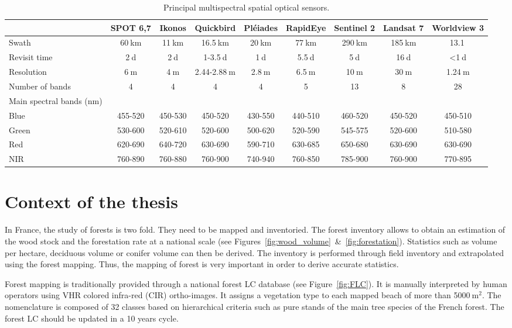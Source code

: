 \begin{table}
\begin{center}
\begin{tabular}{l|c|c|c|c|c|c|c|c}
& \textbf{SPOT 6,7} & \textbf{Ikonos} & \textbf{Quickbird} & \textbf{Pléiades} & \textbf{RapidEye} & \textbf{Sentinel 2} & \textbf{Landsat 7} & \textbf{Worldview 3}\\
\hline
Swath & 60$\:$km & 11$\:$km & 16.5$\:$km & 20$\:$km & 77$\:$km & 290$\:$km & 185$\:$km & 13.1$\:$\\
Revisit time & 2$\:$d & 2$\:$d & 1-3.5$\:$d & 1$\:$d & 5.5$\:$d & 5$\:$d & 16$\:$d & <1$\:$d\\
Resolution & 6$\:$m & 4$\:$m & 2.44-2.88$\:$m & 2.8$\:$m & 6.5$\:$m & 10$\:$m & 30$\:$m & 1.24$\:$m\\
Number of bands & 4 & 4 & 4 & 4 & 5 & 13 & 8 & 28\\
Main spectral bands (nm) & & & & & & & &\\
Blue & 455-520 & 450-530 & 450-520 & 430-550 & 440-510 & 460-520 & 450-520 & 450-510\\ 
Green & 530-600 & 520-610 & 520-600 & 500-620 & 520-590 & 545-575 & 520-600 & 510-580\\
Red & 620-690 & 640-720 & 630-690 & 590-710 & 630-685 & 650-680 & 630-690 & 630-690\\
NIR & 760-890 & 760-880 & 760-900 & 740-940 & 760-850 & 785-900 & 760-900 & 770-895\\
\end{tabular}
\end{center}
\caption{Principal multispectral spatial optical sensors.}
\label{table:spatial_satellites}
\end{table}

\section{Context of the thesis}
In France, the study of forests is two fold. They need to be mapped and inventoried. The forest inventory allows to obtain an estimation of the wood stock and the forestation rate at a national scale (see Figures~\ref{fig:wood_volume}~\&~\ref{fig:forestation}). Statistics such as volume per hectare, deciduous volume or conifer volume can then be derived. The inventory is performed through field inventory and extrapolated using the forest mapping. Thus, the mapping of forest is very important in order to derive accurate statistics.	

Forest mapping is traditionally provided through a national forest LC database (see Figure~\ref{fig:FLC}). It is manually interpreted by human operators using VHR colored infra-red (CIR) ortho-images. It assigns a vegetation type to each mapped beach of more than 5000$\:$m$^{2}$. The nomenclature is composed of 32 classes based on hierarchical criteria such as pure stands of the main tree species of the French forest. The forest LC should be updated in a 10 years cycle.

